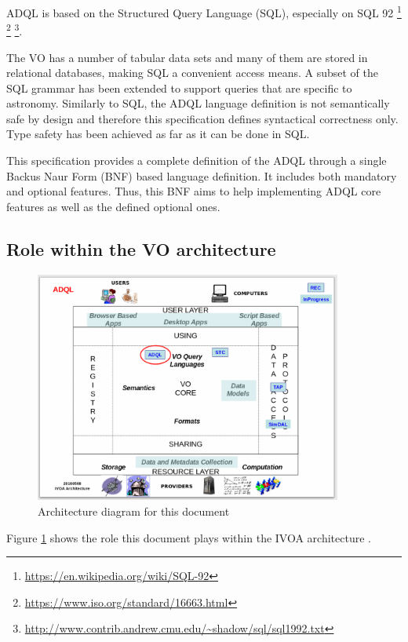\documentclass[11pt,a4paper]{ivoa}
\begin{document}
ADQL is based on the Structured Query Language (SQL), especially on SQL 92
\footnote{\url{https://en.wikipedia.org/wiki/SQL-92}}
\footnote{\url{https://www.iso.org/standard/16663.html}}
\footnote{\url{http://www.contrib.andrew.cmu.edu/~shadow/sql/sql1992.txt}}.

The VO has a number of tabular data sets and many of them are stored in relational
databases, making SQL a convenient access means. A subset of the SQL grammar
has been extended to support queries that are specific to astronomy. Similarly
to SQL, the ADQL language definition is not semantically safe by design and
therefore this specification defines syntactical correctness only. Type safety
has been achieved as far as it can be done in SQL. 

This specification provides a complete definition of the ADQL through a single
Backus Naur Form (BNF) based language definition. It includes both mandatory
and optional features. Thus, this BNF aims to help implementing ADQL core
features as well as the defined optional ones.

\clearpage %
\subsection{Role within the VO architecture}
\label{sec:role}

\begin{figure}[th]
\centering
\includegraphics[width=0.9\textwidth]{ADQL-archdiag.png}
\caption{Architecture diagram for this document}
\label{fig:archdiag}
\end{figure}

Figure \ref{fig:archdiag} shows the role this document plays within the
IVOA architecture \VOArch{}.
\end{document}
